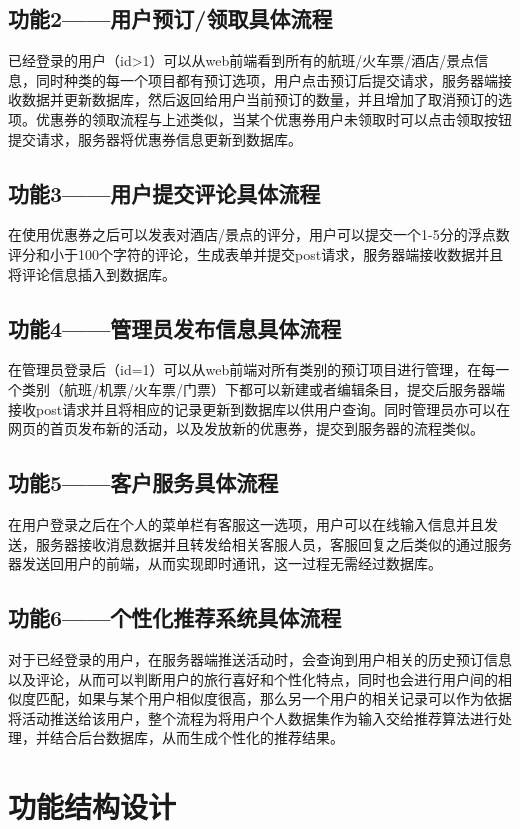 \subsection{功能2——用户预订/领取具体流程}
已经登录的用户（id>1）可以从web前端看到所有的航班/火车票/酒店/景点信息，同时种类的每一个项目都有预订选项，用户点击预订后提交请求，服务器端接收数据并更新数据库，然后返回给用户当前预订的数量，并且增加了取消预订的选项。优惠券的领取流程与上述类似，当某个优惠券用户未领取时可以点击领取按钮提交请求，服务器将优惠券信息更新到数据库。

\subsection{功能3——用户提交评论具体流程}
在使用优惠券之后可以发表对酒店/景点的评分，用户可以提交一个1-5分的浮点数评分和小于100个字符的评论，生成表单并提交post请求，服务器端接收数据并且将评论信息插入到数据库。

\subsection{功能4——管理员发布信息具体流程}
在管理员登录后（id=1）可以从web前端对所有类别的预订项目进行管理，在每一个类别（航班/机票/火车票/门票）下都可以新建或者编辑条目，提交后服务器端接收post请求并且将相应的记录更新到数据库以供用户查询。同时管理员亦可以在网页的首页发布新的活动，以及发放新的优惠券，提交到服务器的流程类似。

\subsection{功能5——客户服务具体流程}
在用户登录之后在个人的菜单栏有客服这一选项，用户可以在线输入信息并且发送，服务器接收消息数据并且转发给相关客服人员，客服回复之后类似的通过服务器发送回用户的前端，从而实现即时通讯，这一过程无需经过数据库。

\subsection{功能6——个性化推荐系统具体流程}
对于已经登录的用户，在服务器端推送活动时，会查询到用户相关的历史预订信息以及评论，从而可以判断用户的旅行喜好和个性化特点，同时也会进行用户间的相似度匹配，如果与某个用户相似度很高，那么另一个用户的相关记录可以作为依据将活动推送给该用户，整个流程为将用户个人数据集作为输入交给推荐算法进行处理，并结合后台数据库，从而生成个性化的推荐结果。




\section{功能结构设计}
